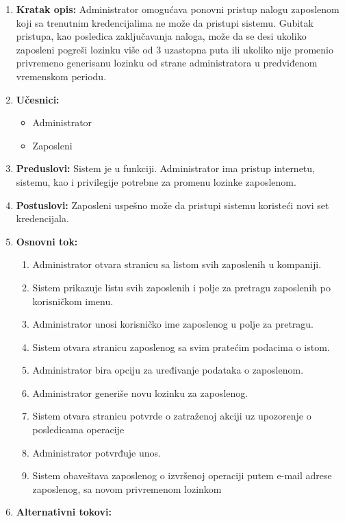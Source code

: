 \documentclass[a4paper]{article}
\begin{document}
\begin{enumerate}
    \item \textbf{Kratak opis:} Administrator omogućava ponovni pristup nalogu zaposlenom koji sa trenutnim kredencijalima ne može da pristupi sistemu. Gubitak pristupa, kao posledica zaključavanja naloga, može da se desi ukoliko zaposleni pogreši lozinku više od 3 uzastopna puta ili ukoliko nije promenio privremeno generisanu lozinku od strane administratora u predviđenom vremenskom periodu.
    \item \textbf{Učesnici:}
        \begin{itemize}
            \item Administrator
            \item Zaposleni
        \end{itemize}
    \item \textbf{Preduslovi:} Sistem je u funkciji. Administrator ima pristup internetu, sistemu, kao i privilegije potrebne za promenu lozinke zaposlenom.
    \item \textbf{Postuslovi:} Zaposleni uspešno može da pristupi sistemu koristeći novi set kredencijala.
    \item \textbf{Osnovni tok:}
        \begin{enumerate}
            \item Administrator otvara stranicu sa listom svih zaposlenih u kompaniji.
            \item Sistem prikazuje listu svih zaposlenih i polje za pretragu zaposlenih po korisničkom imenu.
            \item Administrator unosi korisničko ime zaposlenog u polje za pretragu.
            \item Sistem otvara stranicu zaposlenog sa svim pratećim podacima o istom.
            \item Administrator bira opciju za uređivanje podataka o zaposlenom.
            \item Administrator generiše novu lozinku za zaposlenog.
            \item Sistem otvara stranicu potvrde o zatraženoj akciji uz upozorenje o posledicama operacije
            \item Administrator potvrđuje unos.
            \item Sistem obaveštava zaposlenog o izvršenoj operaciji putem e-mail adrese zaposlenog, sa novom privremenom lozinkom
        \end{enumerate}
    \item \textbf{Alternativni tokovi:}

\end{enumerate}
\end{document}

